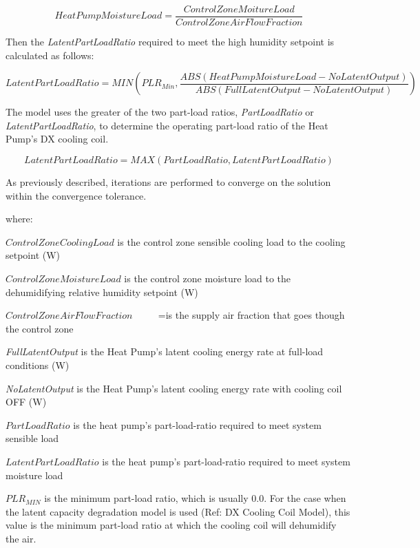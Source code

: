 \begin{equation}
HeatPumpMoistureLoad = \frac{{ControlZoneMoitureLoad}}{{ControlZoneAirFlowFraction}}
\end{equation}

Then the \emph{LatentPartLoadRatio} required to meet the high humidity setpoint is calculated as follows:

\begin{equation}
LatentPartLoadRatio = MIN\left( {PL{R_{Min}},\frac{{ABS\left( {HeatPumpMoistureLoad - NoLatentOutput} \right)}}{{ABS\left( {FullLatentOutput - NoLatentOutput} \right)}}} \right)
\end{equation}

The model uses the greater of the two part-load ratios, \emph{PartLoadRatio} or \emph{LatentPartLoadRatio}, to determine the operating part-load ratio of the Heat Pump's DX cooling coil.

\begin{equation}
LatentPartLoadRatio = MAX\left( {PartLoadRatio,LatentPartLoadRatio} \right)
\end{equation}

As previously described, iterations are performed to converge on the solution within the convergence tolerance.

where:

\(ControlZoneCoolingLoad\) is the control zone sensible cooling load to the cooling setpoint (W)

\(ControlZoneMoistureLoad\) is the control zone moisture load to the dehumidifying relative humidity setpoint (W)

\(ControlZoneAirFlowFraction\) ~~~~ =is  the supply air fraction that goes though the control zone

\emph{FullLatentOutput} is the Heat Pump's latent cooling energy rate at full-load conditions (W)

\emph{NoLatentOutput} is the Heat Pump's latent cooling energy rate with cooling coil OFF (W)

\(PartLoadRatio\) is the heat pump's part-load-ratio required to meet system sensible load

\(LatentPartLoadRatio\) is the heat pump's part-load-ratio required to meet system moisture load

\(PL{R_{MIN}}\) is the minimum part-load ratio, which is usually 0.0. For the case when the latent capacity degradation model is used (Ref: DX Cooling Coil Model), this value is the minimum part-load ratio at which the cooling coil will dehumidify the air.

